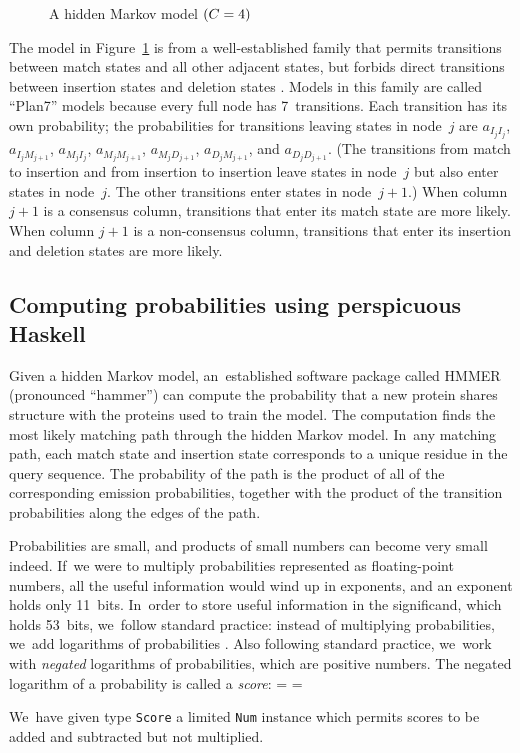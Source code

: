\documentclass[]{jfp1}
\newcommand\txprobxj[3][]{a#1_{{#2}_{j}{#3}_{j+1}}}  %
\newcommand\txprobjj[3][]{a#1_{{#2}_{j}{#3}_j}} %
\newcommand\alignwidth{\ensuremath C} %
\newcommand\figref[1]{Figure~\ref{fig:#1}}
\newcommand\figlabel[1]{\label{fig:#1}}
\newcommand\seclabel[1]{\label{sec:#1}}
\newif\ifverbatimsmall
\newcommand\smallverbatiminput[1]{%
  \verbatimsmalltrue
  \presvtopsep=\topsep
  \topsep=0.78\topsep
  \verbatimsmallfalse
  \topsep=\presvtopsep
}
\let\cite\citep
\begin{document}
\begin{figure} 
\centerline{} 

\caption{A hidden Markov model $(\alignwidth = 4)$}

\figlabel{plan7}
\end{figure}

The model in \figref{plan7} is from a well-established family
that permits
transitions between match states and all other adjacent states,
but forbids
direct
transitions between insertion 
states and deletion states  \cite{Eddy:1998ut}. 
Models in this family are called ``Plan7'' models because
every full node has 7~transitions.
Each transition has its own probability; the probabilities for
transitions leaving states in node~$j$ are
$\txprobjj I I$,
$\txprobxj I M$,
$\txprobjj M I$,
$\txprobxj M M$,
$\txprobxj M D$,
$\txprobxj D M$,
and
$\txprobxj D D$.
(The transitions from match to insertion and from insertion to
insertion leave states in 
node~$j$ but also enter states in node~$j$.
The other transitions enter states in node~$j+1$.)
When column $j+1$ is a consensus column, transitions that enter
its match state 
are more likely.
When column $j+1$ is a non-consensus column, transitions that enter
its insertion and deletion states are more likely.








\subsection{Computing probabilities using perspicuous Haskell}

\seclabel{viterbi}


Given a hidden Markov model, 
an~established software package called HMMER (pronounced ``hammer'') 
can compute the probability
that a new protein shares structure 
with the proteins used to train the model.
The computation finds the most likely matching path through the hidden Markov model.
In~any matching path, each match state and insertion state corresponds to a
unique residue in the query sequence.
The probability of the path is the product of all of the corresponding
emission probabilities, together with the product of the transition
probabilities along the edges of the path.

Probabilities are small, and products of small numbers can become very
small indeed.
If~we were to multiply probabilities represented as floating-point
numbers, all the useful information would wind up in exponents,
and an exponent holds only
11~bits.
In~order to store useful information in the significand, which holds 53~bits,
we~follow standard practice: instead of multiplying probabilities,
we~add logarithms of probabilities \cite{Viterbi:1967hq}.
Also following standard practice, we~work with
\emph{negated}
logarithms of probabilities, which are  positive numbers.
The negated logarithm of a probability is called a \emph{score}:
\smallverbatiminput{score}
We~have given type \texttt{Score} a limited \texttt{Num} instance which permits
scores to be added and subtracted but not multiplied.
\end{document}
